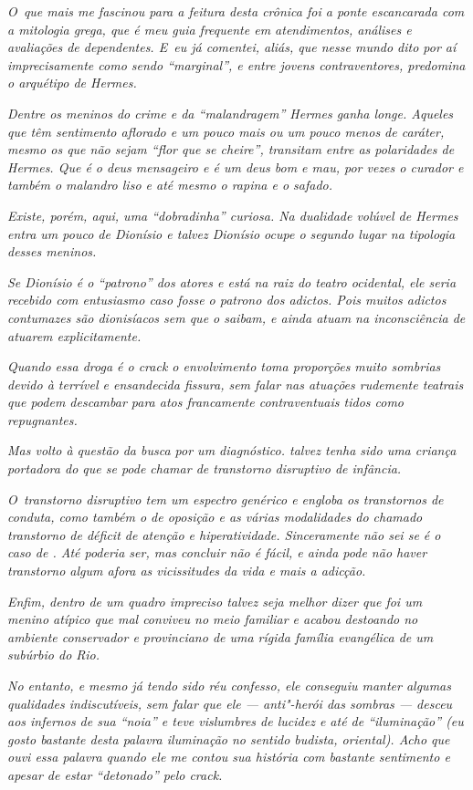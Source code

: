 \emph{O~que mais me fascinou para a feitura desta crônica foi a ponte
escancarada com a mitologia grega, que é meu guia frequente em
atendimentos, análises e avaliações de dependentes. E~eu já comentei,
aliás, que nesse mundo dito por aí imprecisamente como sendo
``marginal'', e entre jovens contraventores, predomina o arquétipo de
Hermes.}~

\emph{Dentre os meninos do crime e da ``malandragem'' Hermes ganha
longe. Aqueles que têm sentimento aflorado e um pouco mais ou um pouco
menos de caráter, mesmo os que não sejam ``flor que se cheire'',
transitam entre as polaridades de Hermes. Que é o deus mensageiro e é um
deus bom e mau, por vezes o curador e também o malandro liso e até mesmo
o rapina e o safado.}~

\emph{Existe, porém, aqui, uma ``dobradinha'' curiosa. Na dualidade
volúvel de Hermes entra um pouco de Dionísio e talvez Dionísio ocupe o
segundo lugar na tipologia desses meninos.}~

\emph{Se Dionísio é o ``patrono'' dos atores e está na raiz do teatro
ocidental, ele seria recebido com entusiasmo caso fosse o patrono dos
adictos. Pois muitos adictos contumazes são dionisíacos sem que o
saibam, e ainda atuam na inconsciência de atuarem explicitamente.}~

\emph{Quando essa droga é o crack o envolvimento toma proporções muito
sombrias devido à terrível e ensandecida fissura, sem falar nas atuações
rudemente teatrais que podem descambar para atos francamente
contraventuais tidos como repugnantes.}~

\emph{Mas volto à questão da busca por um diagnóstico.  talvez tenha
sido uma criança portadora do que se pode chamar de transtorno
disruptivo de infância.}~

\emph{O~transtorno disruptivo tem um espectro genérico e engloba os
transtornos de conduta, como também o de oposição e as várias
modalidades do chamado transtorno de déficit de atenção e
hiperatividade. Sinceramente não sei se é o caso de . Até poderia ser,
mas concluir não é fácil, e ainda pode não haver transtorno algum afora
as vicissitudes da vida e mais a adicção.}~

\emph{Enfim, dentro de um quadro impreciso talvez seja melhor dizer que
 foi um menino atípico que mal conviveu no meio familiar e acabou
destoando no ambiente conservador e provinciano de uma rígida família
evangélica de um subúrbio do Rio.}~

\emph{No entanto, e mesmo já tendo sido réu confesso, ele conseguiu
manter algumas qualidades indiscutíveis, sem falar que ele ---
anti"-herói das sombras --- desceu aos infernos de sua ``noia'' e teve
vislumbres de lucidez e até de ``iluminação'' (eu gosto bastante desta
palavra iluminação no sentido budista, oriental). Acho que ouvi essa
palavra quando ele me contou sua história com bastante sentimento e
apesar de estar ``detonado'' pelo crack.}~

